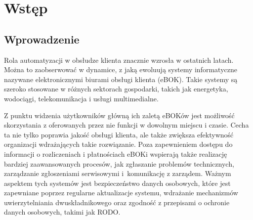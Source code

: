 \chapter{Wstęp}
\section{Wprowadzenie}
Rola automatyzacji w obsłudze klienta znacznie wzrosła w ostatnich latach. Można to zaobserwować w dynamice, z jaką ewoluują systemy informatyczne nazywane elektronicznymi biurami obsługi klienta (eBOK). Takie systemy są szeroko stosowane w różnych sektorach gospodarki, takich jak energetyka, wodociągi, telekomunikacja i usługi multimedialne. 

Z punktu widzenia użytkowników główną ich zaletą eBOKów jest możliwość skorzystania z oferowanych przez nie funkcji w dowolnym miejscu i czasie. Cecha ta nie tylko poprawia jakość obsługi klienta, ale także zwiększa efektywność organizacji wdrażających takie rozwiązanie. Poza zapewnieniem dostępu do informacji o rozliczeniach i płatnościach eBOKi wspierają także realizację bardziej zaawansowanych procesów, jak zgłaszanie problemów technicznych, zarządzanie zgłoszeniami serwisowymi i~komunikację z zarządem. Ważnym aspektem tych systemów jest bezpieczeństwo danych osobowych, które jest zapewniane poprzez regularne aktualizacje systemu, wdrażanie mechanizmów uwierzytelniania dwuskładnikowego oraz zgodność z przepisami o ochronie danych osobowych, takimi jak RODO.

